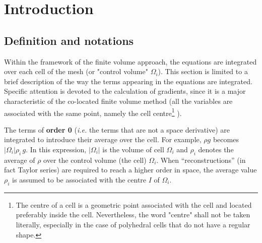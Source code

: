 
%
%
%
%


\section{Introduction}

\subsection{Definition and notations}

Within the framework of the finite volume approach, the equations are
integrated over each cell of the mesh (or "control volume" $\Omega_i$). 
This section is limited to a brief description of the way the terms appearing in
the equations are integrated. Specific attention is devoted to the
calculation of gradients, since it is a major characteristic of the
co-located finite volume method (all the variables are associated with the
same point, namely the cell centre\footnote{%
The centre of a cell is a geometric point associated with the cell and
located preferably inside the cell. Nevertheless, the word "centre" shall
not be taken literally,
especially in the case of polyhedral cells that do not have a regular shape.}%
).

The terms of \textbf{order 0} (\emph{i.e.} the terms that are not a space
derivative) are integrated to introduce their average over the cell. For
example, $\rho g$ becomes $|\Omega _{i}|\rho_{i}\,g$. 
In this expression, $|\Omega _{i}|$ is the volume of cell $\Omega _{i}$ and 
$\rho_{i}$ denotes the average of $\rho $ over the control volume
(the cell) $\Omega _{i}$. When
``reconstructions'' (in fact Taylor series) are required to reach a higher
order in space, the average value $\rho_{i}$ is assumed to be associated
with the centre $I$ of $\Omega _{i}$.

